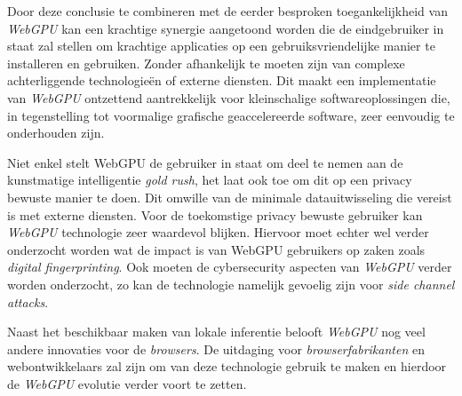 \bigbreak{}

Door deze conclusie te combineren met de eerder besproken toegankelijkheid van \textit{WebGPU} kan een krachtige synergie aangetoond worden die de eindgebruiker in staat zal stellen om krachtige applicaties op een gebruiksvriendelijke manier te installeren en gebruiken. Zonder afhankelijk te moeten zijn van complexe achterliggende technologieën of externe diensten. Dit maakt een implementatie van \textit{WebGPU} ontzettend aantrekkelijk voor kleinschalige softwareoplossingen die, in tegenstelling tot voormalige grafische geaccelereerde software, zeer eenvoudig te onderhouden zijn.


\bigbreak{}

Niet enkel stelt WebGPU de gebruiker in staat om deel te nemen aan de kunstmatige intelligentie \textit{gold rush}, het laat ook toe om dit op een privacy bewuste manier te doen. Dit omwille van de minimale datauitwisseling die vereist is met externe diensten. Voor de toekomstige privacy bewuste gebruiker kan \textit{WebGPU} technologie zeer waardevol blijken. Hiervoor moet echter wel verder onderzocht worden wat de impact is van WebGPU gebruikers op zaken zoals \textit{digital fingerprinting}. Ook moeten de cybersecurity aspecten van \textit{WebGPU} verder worden onderzocht, zo kan de technologie namelijk gevoelig zijn voor \textit{side channel attacks}.

\bigbreak{}

Naast het beschikbaar maken van lokale inferentie belooft \textit{WebGPU} nog veel andere innovaties voor de \textit{browsers}. De uitdaging voor \textit{browserfabrikanten} en webontwikkelaars zal zijn om van deze technologie gebruik te maken en hierdoor de \textit{WebGPU} evolutie verder voort te zetten.